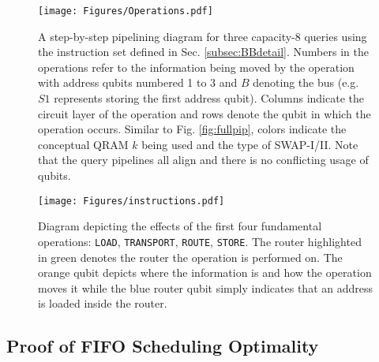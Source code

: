 \begin{figure*}[t]
         \centering
         \texttt{[image: Figures/Operations.pdf]}
         \caption{A step-by-step pipelining diagram for three capacity-8 queries using the instruction set defined in Sec. \ref{subsec:BBdetail}. Numbers in the operations refer to the information being moved by the operation with address qubits numbered 1 to 3 and $B$ denoting the bus (e.g. $S1$ represents storing the first address qubit). Columns indicate the circuit layer of the operation and rows denote the qubit in which the operation occurs. Similar to Fig. \ref{fig:fullpip}, colors indicate the conceptual QRAM $k$ being used and the type of SWAP-I/II. Note that the query pipelines all align and there is no conflicting usage of qubits.}
         \label{fig:detailbb}
\end{figure*}

\begin{figure}[t]
         \centering
         \texttt{[image: Figures/instructions.pdf]}
         \caption{Diagram depicting the effects of the first four fundamental operations: \texttt{LOAD}, \texttt{TRANSPORT}, \texttt{ROUTE}, \texttt{STORE}. The router highlighted in green denotes the router the operation is performed on. The orange qubit depicts where the information is and how the operation moves it while the blue router qubit simply indicates that an address is loaded inside the router.}
         \label{fig:instruction}
\end{figure}


\subsection{Proof of FIFO Scheduling Optimality }
\label{subsec:greedyproof}

